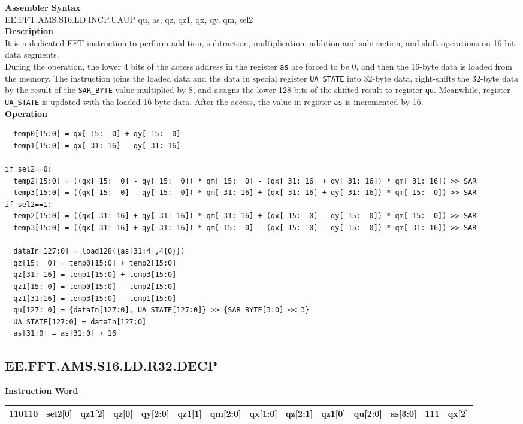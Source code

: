 \textbf{Assembler Syntax} \\
EE.FFT.AMS.S16.LD.INCP.UAUP qu, as, qz, qz1, qx, qy, qm, sel2 \\
\textbf{Description} \\
It is a dedicated FFT instruction to perform addition, subtraction, multiplication, addition and subtraction, and shift operations on 16-bit data segments.\\
During the operation, the lower 4 bits of the access address in the register \lstinline{as} are forced to be 0, and then the 16-byte data is loaded from the memory. The instruction joins the loaded data and the data in special register \lstinline{UA_STATE} into 32-byte data, right-shifts the 32-byte data by the result of the \lstinline{SAR_BYTE} value multiplied by 8, and assigns the lower 128 bits of the shifted result to register \lstinline{qu}. Meanwhile, register \lstinline{UA_STATE} is updated with the loaded 16-byte data. After the access, the value in register \lstinline{as} is incremented by 16.\\
\textbf{Operation}
\begin{lstlisting}
  temp0[15:0] = qx[ 15:  0] + qy[ 15:  0]
  temp1[15:0] = qx[ 31: 16] - qy[ 31: 16]

if sel2==0:
  temp2[15:0] = ((qx[ 15:  0] - qy[ 15:  0]) * qm[ 15:  0] - (qx[ 31: 16] + qy[ 31: 16]) * qm[ 31: 16]) >> SAR
  temp3[15:0] = ((qx[ 15:  0] - qy[ 15:  0]) * qm[ 31: 16] + (qx[ 31: 16] + qy[ 31: 16]) * qm[ 15:  0]) >> SAR
if sel2==1:
  temp2[15:0] = ((qx[ 31: 16] + qy[ 31: 16]) * qm[ 31: 16] + (qx[ 15:  0] - qy[ 15:  0]) * qm[ 15:  0]) >> SAR
  temp3[15:0] = ((qx[ 31: 16] + qy[ 31: 16]) * qm[ 15:  0] - (qx[ 15:  0] - qy[ 15:  0]) * qm[ 31: 16]) >> SAR

  dataIn[127:0] = load128({as[31:4],4{0}})
  qz[15:  0] = temp0[15:0] + temp2[15:0]
  qz[31: 16] = temp1[15:0] + temp3[15:0]
  qz1[15: 0] = temp0[15:0] - temp2[15:0]
  qz1[31:16] = temp3[15:0] - temp1[15:0]
  qu[127: 0] = {dataIn[127:0], UA_STATE[127:0]} >> {SAR_BYTE[3:0] << 3}
  UA_STATE[127:0] = dataIn[127:0]
  as[31:0] = as[31:0] + 16
\end{lstlisting}

\clearpage
\subsection{EE.FFT.AMS.S16.LD.R32.DECP}\label{instruction:EEFFTAMSS16LDR32DECP}
\setlength\tabcolsep{5pt}
\textbf{Instruction Word} \\
\begin{tabular}{|c|c|c|c|c|c|c|c|c|c|c|c|c|c|}
	\hline
	110110 & sel2[0] & qz1[2] & qz[0] & qy[2:0] & qz1[1] & qm[2:0] & qx[1:0] & qz[2:1] & qz1[0] & qu[2:0] & as[3:0] & 111 & qx[2] \\
	\hline
\end{tabular}

